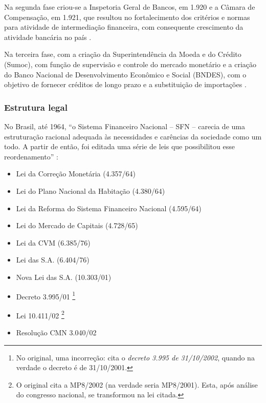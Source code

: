 \documentclass[
	10pt,				%
	openright,			%
	twoside,			%
	a5paper,			%
	english,			%
	french,				%
	spanish,			%
	brazil				%
	]{abntex2}
\begin{document}
Na segunda fase criou-se a Inspetoria Geral de Bancos, em 1.920 e a
Câmara de Compensação, em 1.921, que resultou no fortalecimento dos
critérios e normas para atividade de intermediação financeira, com
consequente crescimento da atividade bancária no país
\cite[p.~12]{beatrizselan}.

Na terceira fase, com a criação da Superintendência da Moeda e do
Crédito (Sumoc), com função de supervisão e controle do mercado
monetário e a criação do Banco Nacional de Desenvolvimento Econômico e
Social (BNDES), com o objetivo de fornecer créditos de longo prazo e a
substituição de importações \cite[p.~12]{beatrizselan}.

\subsubsection{Estrutura legal}\label{estrutura-legal}

No Brasil, até 1964, ``o Sistema Financeiro Nacional -- SFN -- carecia
de uma estruturação racional adequada às necessidades e carências da
sociedade como um todo. A partir de então, foi editada uma série de leis
que possibilitou esse reordenamento'' \cite[p.~15-16]{fortuna2015}:

\begin{itemize}
\tightlist
\item
  Lei da Correção Monetária (4.357/64) \cite{brasil1964a}
\item
  Lei do Plano Nacional da Habitação (4.380/64) \cite{brasil1964b}
\item
  Lei da Reforma do Sistema Financeiro Nacional (4.595/64)
  \cite{brasil1964c}
\item
  Lei do Mercado de Capitais (4.728/65) \cite{brasil1965}
\item
  Lei da CVM (6.385/76) \cite{brasil1976a}
\item
  Lei das S.A. (6.404/76) \cite{brasil1976b}
\item
  Nova Lei das S.A. (10.303/01) \cite{brasil2001a}
\item
  Decreto 3.995/01 \cite{brasil2001b}\footnote{No original, uma
    incorreção:  cita o \emph{decreto
    3.995 de 31/10/2002}, quando na verdade o decreto é de 31/10/2001.}
\item
  Lei 10.411/02 \cite{brasil2002}\footnote{O original cita a MP8/2002
    (na verdade seria MP8/2001). Esta, após análise do congresso
    nacional, se transformou na lei citada.}
\item
  Resolução CMN 3.040/02 \cite{bcb2002}
\end{itemize}
\end{document}
